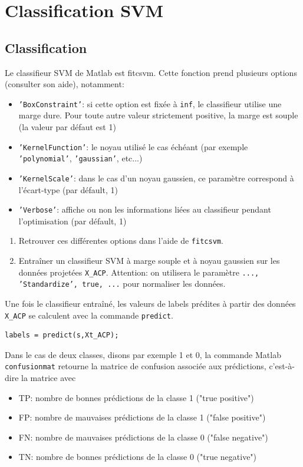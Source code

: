 \section{Classification SVM}

\subsection{Classification}

Le classifieur SVM de Matlab est fitcsvm. Cette fonction prend plusieurs options (consulter son aide), notamment:
\begin{itemize}[label=-]
	\item \texttt{'BoxConstraint'}: si cette option est fixée à \texttt{inf}, le classifieur utilise une marge dure. Pour toute autre valeur strictement positive, la marge est souple (la valeur par défaut est 1)
	\item \texttt{'KernelFunction'}: le noyau utilisé le cas échéant (par exemple \texttt{'polynomial'}, \texttt{'gaussian'}, etc...)
	\item \texttt{'KernelScale'}: dans le cas d'un noyau gaussien, ce paramètre correspond à l'écart-type (par défault, 1)
	\item \texttt{'Verbose'}: affiche ou non les informations liées au classifieur pendant l'optimisation (par défault, 1)
\end{itemize}

\begin{enumerate}
	\item Retrouver ces différentes options dans l'aide de \texttt{fitcsvm}.
	\item Entraîner un classifieur SVM à marge souple et à noyau gaussien sur les données projetées \texttt{X\_ACP}. Attention: on utilisera le paramètre \texttt{..., 'Standardize', true, ...} pour normaliser les données.
\end{enumerate}

Une fois le classifieur entraîné, les valeurs de labels prédites à partir des données \texttt{X\_ACP} se calculent avec la commande \texttt{predict}.
\begin{lstlisting}
labels = predict(s,Xt_ACP);
\end{lstlisting}

Dans le cas de deux classes, disons par exemple 1 et 0, la commande Matlab \texttt{confusionmat} retourne la matrice de confusion associée aux prédictions, c'est-à-dire la matrice  avec
\begin{itemize}[label=-]
	\item TP: nombre de bonnes prédictions de la classe 1 ("true positive")
	\item FP: nombre de mauvaises prédictions de la classe 1 ("false positive")
	\item FN: nombre de mauvaises prédictions de la classe 0  ("false negative")
	\item TN: nombre de bonnes prédictions de la classe 0 ("true negative")
\end{itemize}

